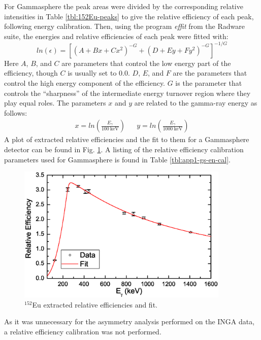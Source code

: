 For Gammasphere the peak areas were divided by the corresponding relative intensities in Table \ref{tbl:152Eu-peaks} to give the relative efficiency of each peak, following energy calibration. Then, using the program \emph{effit} from the Radware suite, the energies and relative efficiencies of each peak were fitted with:
\begin{equation}
\label{eqn:chp3-eff_cal} 
ln(\epsilon) = [(A+Bx+Cx^2)^{-G} + (D+Ey+Fy^2)^{-G}]^{-1/G}
\end{equation}
Here $A$, $B$, and $C$ are parameters that control the low energy part of the efficiency, though $C$ is usually set to $0.0$. $D$, $E$, and $F$ are the parameters that control the high energy component of the efficiency. $G$ is the parameter that controls the ``sharpness'' of the intermediate energy turnover region where they play equal roles. The parameters $x$ and $y$ are related to the gamma-ray energy as follows:
\begin{align*}
\label{eqn:chp3-eff_x_and_y}
x=ln(\frac{E_{\gamma{}}}{100~\textrm{keV}}) && y=ln(\frac{E_{\gamma{}}}{1000~\textrm{keV}})
\end{align*}
A plot of extracted relative efficiencies and the fit to them for a Gammasphere detector can be found in Fig. \ref{fig:chp3-gs-eff-plot}. A listing of the relative efficiency calibration parameters used for Gammasphere is found in Table \ref{tbl:app1-gs-en-cal}.

\begin{figure}[h!]
	\centerline{\includegraphics[width=0.9\textwidth]{./img/c3/gs_eff_plot.eps}}
	\caption{$^{152}$Eu extracted relative efficiencies and fit.}
	\label{fig:chp3-gs-eff-plot}
\end{figure}

As it was unnecessary for the asymmetry analysis performed on the INGA data, a relative efficiency calibration was not performed. %

